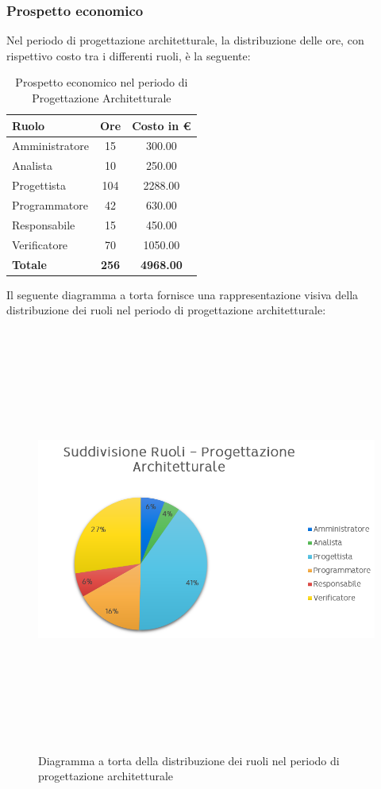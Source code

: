 \subsubsection{Prospetto economico}
Nel periodo di progettazione architetturale, la distribuzione delle ore, con rispettivo costo tra i differenti ruoli, è la seguente:

\begin{table}[htbp]
\centering
\begin{tabular}{| l c c |}
\hline
\textbf{Ruolo} & \textbf{Ore} & \textbf{Costo in €}\\
\hline
Amministratore & 15 & 300.00\\
Analista & 10 & 250.00\\
Progettista & 104 & 2288.00 \\
Programmatore & 42 & 630.00\\
Responsabile & 15 & 450.00\\
Verificatore & 70 & 1050.00\\
\hline
\textbf{Totale} & \textbf{256} & \textbf{4968.00}\\
\hline
\end{tabular}
\caption[Progettazione architetturale - Prospetto economico]{Prospetto economico nel periodo di Progettazione Architetturale}
\end{table}
\newpage
Il seguente diagramma a torta fornisce una rappresentazione visiva della distribuzione dei ruoli nel periodo di progettazione architetturale:

\begin{figure}[htbp]
\centering
\includegraphics[width=14cm,height=14cm,keepaspectratio]{./img/ProspettoOrario/SRProgArch.png}
\caption[Progettazione architetturale - Diagramma a torta suddivisione ruoli]{Diagramma a torta della distribuzione dei ruoli nel periodo di progettazione architetturale}
\end{figure}

